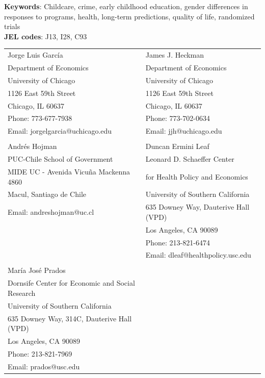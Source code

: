 \noindent \textbf{Keywords}: Childcare, crime, early childhood education, gender differences in responses to programs, health, long-term predictions, quality of life, randomized trials \\
\noindent \textbf{JEL codes}: J13, I28, C93

\bigskip

\begin{tabular}{ll}
Jorge Luis Garc\'{i}a                                       & James J. Heckman \\
Department of Economics                                     & Department of Economics \\
University of Chicago                                       & University of Chicago \\
1126 East 59th Street                                       & 1126 East 59th Street \\
Chicago, IL 60637                                           & Chicago, IL 60637 \\
Phone: 773-677-7938                                         & Phone: 773-702-0634  \\
Email: jorgelgarcia@uchicago.edu                            & Email: jjh@uchicago.edu \\
                                                 & \\
Andr\'{e}s Hojman                                & Duncan Ermini Leaf \\
PUC-Chile School of Government                   & Leonard D. Schaeffer Center \\
MIDE UC - Avenida Vicu\~{n}a Mackenna 4860       & for Health Policy and Economics \\
Macul, Santiago de Chile                          & University of Southern California \\
Email: andreshojman@uc.cl                        & 635 Downey Way, Dauterive Hall (VPD) \\
                                                 & Los Angeles, CA 90089 \\
                                                 & Phone: 213-821-6474 \\
                                                 & Email: dleaf@healthpolicy.usc.edu\\
                                                 & \\
Mar\'{i}a Jos\'{e} Prados \\
Dornsife Center for Economic and Social Research \\
University of Southern California \\
635 Downey Way, 314C, Dauterive Hall (VPD) \\
Los Angeles, CA 90089 \\
Phone: 213-821-7969 \\
Email: prados@usc.edu
\end{tabular}



